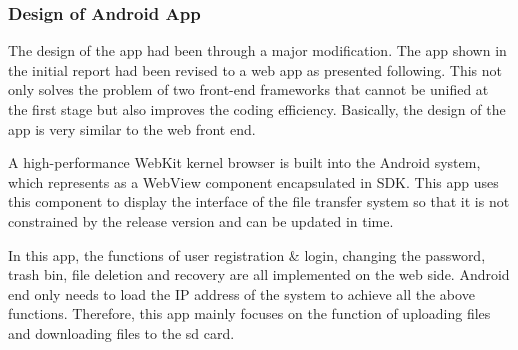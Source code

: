 \documentclass[a4paper,11pt]{article}
\begin{document}
\subsubsection{Design of Android App}
\par The design of the app had been through a major modification. The app shown in the initial report had been revised to a web app as presented following. This not only solves the problem of two front-end frameworks that cannot be unified at the first stage but also improves the coding efficiency. Basically, the design of the app is very similar to the web front end.

\par A high-performance WebKit kernel browser is built into the Android system, which represents as a WebView component encapsulated in SDK. This app uses this component to display the interface of the file transfer system so that it is not constrained by the release version and can be updated in time.

\par In this app, the functions of user registration \& login, changing the password, trash bin, file deletion and recovery are all implemented on the web side. Android end only needs to load the IP address of the system to achieve all the above functions. Therefore, this app mainly focuses on the function of uploading files and downloading files to the sd card.
\end{document}
